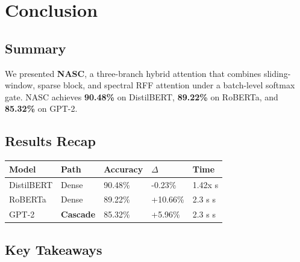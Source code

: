 
\section{Conclusion}

\subsection{Summary}

We presented \textbf{NASC}, a three-branch hybrid attention that combines 
sliding-window, sparse block, and spectral RFF attention under a batch-level 
softmax gate. NASC achieves \textbf{90.48\%} on DistilBERT, \textbf{89.22\%} 
on RoBERTa, and \textbf{85.32\%} on GPT-2.

\subsection{Results Recap}

\begin{table}[H]
\centering
\small
\begin{tabular}{lllll}
\toprule
\textbf{Model} & \textbf{Path} & \textbf{Accuracy} & \textbf{$\Delta$} & \textbf{Time} \\
\midrule
DistilBERT & Dense & 90.48\% & -0.23\% & 1.42x s \\
RoBERTa & Dense & 89.22\% & +10.66\% & 2.3 s s \\
GPT-2 & \textbf{Cascade} & 85.32\% & +5.96\% & 2.3 s s \\
\bottomrule
\end{tabular}
\end{table}

\subsection{Key Takeaways}

